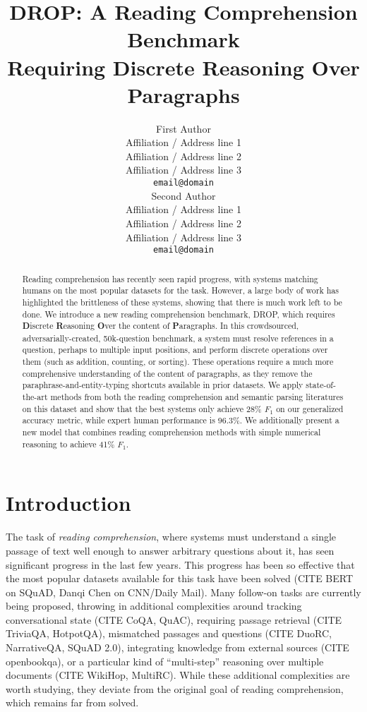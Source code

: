 \documentclass[11pt,a4paper]{article}
\title{DROP: A Reading Comprehension Benchmark \\ Requiring
Discrete Reasoning Over Paragraphs}
\author{First Author \\
  Affiliation / Address line 1 \\
  Affiliation / Address line 2 \\
  Affiliation / Address line 3 \\
  {\tt email@domain} \\\And
  Second Author \\
  Affiliation / Address line 1 \\
  Affiliation / Address line 2 \\
  Affiliation / Address line 3 \\
  {\tt email@domain} \\}
\date{}
\begin{document}
\maketitle
\begin{abstract}
  Reading comprehension has recently seen rapid progress, with systems matching humans on the most popular datasets for the task.  However, a large body of work has highlighted the brittleness of these systems, showing that there is much work left to be done.  We introduce a new reading comprehension benchmark, DROP, which requires {\bf D}iscrete {\bf R}easoning {\bf O}ver the content of {\bf P}aragraphs.  In this crowdsourced, adversarially-created, 50k-question benchmark, a system must resolve references in a question, perhaps to multiple input positions, and perform discrete operations over them (such as addition, counting, or sorting).  These operations require a much more comprehensive understanding of the content of paragraphs, as they remove the paraphrase-and-entity-typing shortcuts available in prior datasets.  We apply state-of-the-art methods from both the reading comprehension and semantic parsing literatures on this dataset and show that the best systems only achieve 28\% $F_1$ on our generalized accuracy metric, while expert human performance is 96.3\%.  We additionally present a new model that combines reading comprehension methods with simple numerical reasoning to achieve 41\% $F_1$.

\end{abstract}

\section{Introduction}
The task of \emph{reading comprehension}, where systems must understand a single passage of text well enough to answer arbitrary questions about it, has seen significant progress in the last few years.  This progress has been so effective that the most popular datasets available for this task have been solved (CITE BERT on SQuAD, Danqi Chen on CNN/Daily Mail).  Many follow-on tasks are currently being proposed, throwing in additional complexities around tracking conversational state (CITE CoQA, QuAC), requiring passage retrieval (CITE TriviaQA, HotpotQA), mismatched passages and questions (CITE DuoRC, NarrativeQA, SQuAD 2.0), integrating knowledge from external sources (CITE openbookqa), or a particular kind of ``multi-step'' reasoning over multiple documents (CITE WikiHop, MultiRC).  While these additional complexities are worth studying, they deviate from the original goal of reading comprehension, which remains far from solved.
\end{document}
